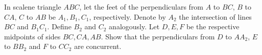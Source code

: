In scalene triangle $ABC$, let the feet of the perpendiculars from $A$ to $BC$, $B$ to $CA$, $C$ to $AB$ be $A_1, B_1, C_1$, respectively. Denote by $A_2$ the intersection of lines $BC$ and $B_1C_1$. Define $B_2$ and $C_2$ analogously. Let $D, E, F$ be the respective midpoints of sides $BC, CA, AB$. Show that the perpendiculars from $D$ to $AA_2$, $E$ to $BB_2$ and $F$ to $CC_2$ are concurrent.